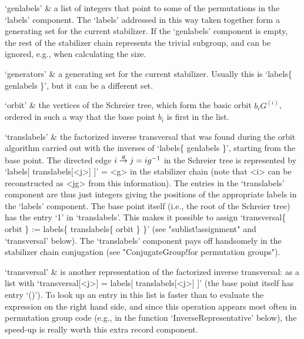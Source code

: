 `genlabels' &
        a list of integers that point to some  of the permutations in the
        `labels' component. The    `labels' addressed in this   way taken
        together form a generating set for the current stabilizer. If the
        `genlabels' component is empty,  the rest of the stabilizer chain
        represents  the trivial subgroup, and  can be ignored, e.g., when
        calculating the size.

`generators' &
        a generating set for    the current stabilizer. Usually this   is
        `labels\{ genlabels \}', but it can be a different set.

`orbit' &
        the vertices of  the Schreier tree,  which  form the basic  orbit
        $b_iG^{(i)}$, ordered in such a way that the  base point $b_i$ is
        first in the list.

`translabels' &
        the factorized inverse   transversal  that was found  during  the
        orbit algorithm carried   out   with the inverses  of   `labels\{
        genlabels \}', starting from the base point. The directed edge $i
        \labelto g j  = ig^{-1}$ in the Schreier  tree is  represented by
        `labels[ translabels[<j>] ]' = <g>  in the stabilizer chain (note
        that <i> can be reconstructed as <jg> from this information). The
        entries  in the `translabels'   component are thus  just integers
        giving  the positions of the appropriate   labels in the `labels'
        component. The base point itself (i.e.,  the root of the Schreier
        tree) has the entry `1' in  `translabels'. This makes it possible
        to assign `transversal\{ orbit \} := labels\{ translabels\{ orbit
        \} \}' (see   "sublist!assignment" and  `transversal' below). The
        `translabels'  component  pays off  handsomely  in the stabilizer
        chain conjugation (see "ConjugateGroup!for permutation groups").

`transversal' &
        is another  representation of the factorized inverse transversal:
        as a list   with `transversal[<j>] =  labels[ translabels[<j>] ]'
        (the base point  itself has entry `()').  To look up  an entry in
        this list is faster than to evaluate  the expression on the right
        hand side,  and   since this operation   appears  most  often  in
        permutation   group     code    (e.g.,    in      the    function
        `InverseRepresentative' below), the speed-up is really worth this
        extra record component.

